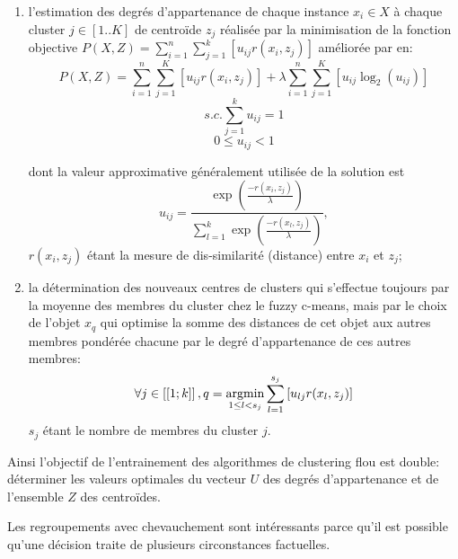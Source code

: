 \begin{enumerate}
 \item l'estimation des degrés d'appartenance de chaque instance $x_i \in X$ à chaque cluster $j \in [1..K]$ de centroïde $z_j$ réalisée par la minimisation de la fonction objective $P(X,Z) = \sum\limits_{i=1}^{n}\sum\limits_{j=1}^{k} \left[u_{ij}r(x_i,z_j)\right]$ \citep{krishnapuram2001fuzzycmedoids}  améliorée par \citet{sabzi2011fuzzykmedoids} en:
 \[P(X,Z) = \sum\limits_{i=1}^{n}\sum\limits_{j=1}^{K} \left[u_{ij}r(x_i,z_j)\right] + \lambda \sum\limits_{i=1}^{n}\sum\limits_{j=1}^{K} \left[ u_{ij}\log_2(u_{ij}) \right] \]
 \[s.c. \sum\limits_{j=1}^{k} u_{ij} = 1\]
 \[0 \leq u_{ij} < 1\]
 
 dont la valeur approximative généralement utilisée de la solution est \[u_{ij} = \frac{\exp\left(\frac{-r(x_i,z_j)}{\lambda}\right)}{\sum_{l=1}^{k}\exp\left(\frac{-r(x_l,z_j)}{\lambda}\right)},\] $r(x_i,z_j)$ étant la mesure de dis-similarité (distance) entre $x_i$ et  $z_j$;
 \item la détermination des nouveaux centres de clusters qui s'effectue toujours par la moyenne des membres du cluster chez le fuzzy c-means, mais par le choix de l'objet $x_q$ qui optimise la somme des distances de cet objet aux autres membres pondérée chacune par le degré d'appartenance de ces autres membres: \[\forall j \in \left[ \left[1;k \right] \right], q = \mathop{\mathrm{argmin}}\limits\limits_{1 \leq l < s_j} \sum\limits_{l=1}^{s_j} \left[u_{lj}r(x_l,z_j)\right]\] $s_j$ étant le nombre de membres du cluster $j$.
\end{enumerate}
 Ainsi l'objectif de l'entrainement des algorithmes de clustering flou est double: déterminer les valeurs optimales du vecteur  $U$ des degrés d'appartenance et de l'ensemble $Z$ des centroïdes. 
 
 Les regroupements avec chevauchement sont intéressants parce qu'il est possible qu'une décision traite de plusieurs circonstances factuelles.

